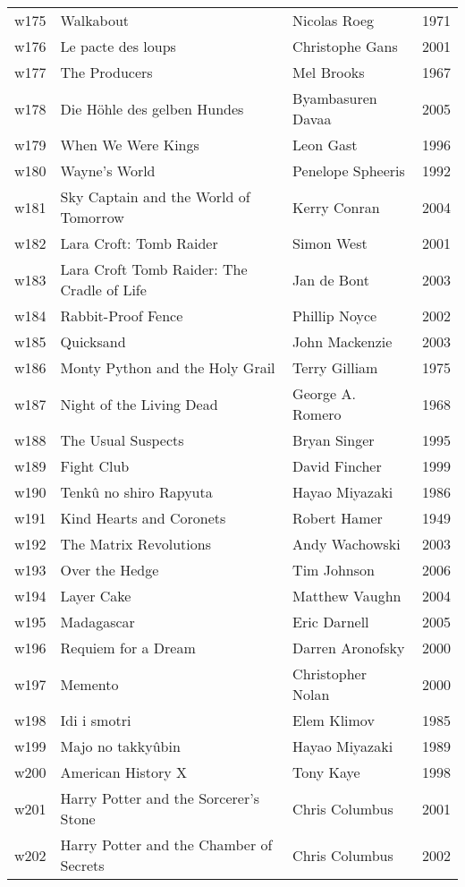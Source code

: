 \documentclass{article}
\begin{document}
\begin {center}
\begin{longtable}{l p{10cm} l l}
w175 & Walkabout & Nicolas Roeg & 1971 \\
w176 & Le pacte des loups & Christophe Gans & 2001 \\
w177 & The Producers & Mel Brooks & 1967 \\
w178 & Die Höhle des gelben Hundes & Byambasuren Davaa & 2005 \\
w179 & When We Were Kings & Leon Gast & 1996 \\
w180 & Wayne's World & Penelope Spheeris & 1992 \\
w181 & Sky Captain and the World of Tomorrow & Kerry Conran & 2004 \\
w182 & Lara Croft: Tomb Raider & Simon West & 2001 \\
w183 & Lara Croft Tomb Raider: The Cradle of Life & Jan de Bont & 2003 \\
w184 & Rabbit-Proof Fence & Phillip Noyce & 2002 \\
w185 & Quicksand & John Mackenzie & 2003 \\
w186 & Monty Python and the Holy Grail & Terry Gilliam & 1975 \\
w187 & Night of the Living Dead & George A. Romero & 1968 \\
w188 & The Usual Suspects & Bryan Singer & 1995 \\
w189 & Fight Club & David Fincher & 1999 \\
w190 & Tenkû no shiro Rapyuta & Hayao Miyazaki & 1986 \\
w191 & Kind Hearts and Coronets & Robert Hamer & 1949 \\
w192 & The Matrix Revolutions & Andy Wachowski & 2003 \\
w193 & Over the Hedge & Tim Johnson & 2006 \\
w194 & Layer Cake & Matthew Vaughn & 2004 \\
w195 & Madagascar & Eric Darnell & 2005 \\
w196 & Requiem for a Dream & Darren Aronofsky & 2000 \\
w197 & Memento & Christopher Nolan & 2000 \\
w198 & Idi i smotri & Elem Klimov & 1985 \\
w199 & Majo no takkyûbin & Hayao Miyazaki & 1989 \\
w200 & American History X & Tony Kaye & 1998 \\
w201 & Harry Potter and the Sorcerer's Stone & Chris Columbus & 2001 \\
w202 & Harry Potter and the Chamber of Secrets & Chris Columbus & 2002 \\

\end{longtable}
\end{center}
\end{document}
